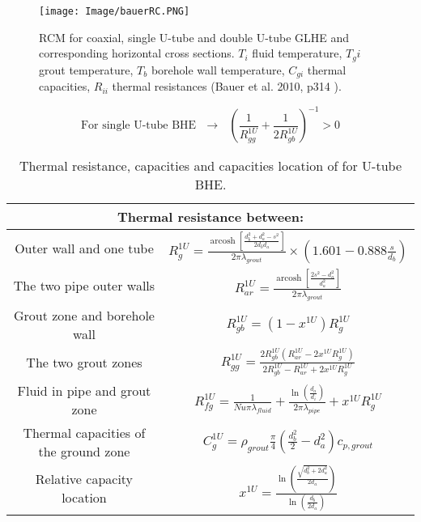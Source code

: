 \documentclass[a4paper,oneside,11pt]{report}
\begin{document}
	\begin{figure}[hbtp] 
		\centering
		\texttt{[image: Image/bauerRC.PNG]}
		\caption{RCM for coaxial, single U-tube and double U-tube GLHE and corresponding horizontal cross sections. $T_i$ fluid temperature, $T_gi$ grout temperature, $T_b$ borehole wall temperature, $C_{gi}$ thermal capacities, $R_{ii}$ thermal resistances (Bauer et al. 2010, p314 \cite{bau10}).}
		\label{fig:bf_bauerRC}
	\end{figure}

\begin{equation} \label{eq:bf_bauTest}
\text{For single U-tube BHE} \ \ \  \rightarrow \ \ \ \left( \frac{1}{R_{gg}^{1U}} + \frac{1}{2 R_{gb}^{1U}}  \right)^{-1} > 0
\end{equation}

{\setlength{\extrarowheight}{16pt}
\begin{table}
\begin{center}
\begin{tabular}{|c|c|}
\hline
\multicolumn{2}{|c|}{Thermal resistance between: } \\
\hline  \hline
Outer wall and one tube & $
R_g^{1U} =  \frac{ \operatorname{arcosh} \left[ \frac{ d_b^2 + d_a^2 - s^2}{2 d_b d_a} \right] }{ 2 \pi \lambda_{grout} } \times ( 1.601 - 0.888 \frac{s}{d_b}) 
$ \\ 
\hline 
The two pipe outer walls & $ 
R_{ar}^{1U} = \frac{ \operatorname{arcosh} \left[ \frac{ 2 s^2 - d_a^2 }{ d_a^2 } \right] }{ 2 \pi \lambda_{grout} } 
$ \\ 
\hline \hline 
Grout zone and borehole wall & $
R_{gb}^{1U} = ( 1 - x^{1U} ) R_{g}^{1U}
$ \\ 
\hline 
The two grout zones & $
R_{gg}^{1U} = \frac{ 2 R_{gb}^{1U} ( R_{ar}^{1U} - 2 x^{1U} R_{g}^{1U} ) }{ 2 R_{gb}^{1U} - R_{ar}^{1U} + 2 x^{1U} R_{g}^{1U}}
$ \\ 
\hline 
Fluid in pipe and grout zone & $
R_{fg}^{1U} = \frac{1}{Nu \pi \lambda_{fluid} } + \frac{ \ln \left( \frac{d_a}{d_i} \right) }{2 \pi \lambda_{pipe} } + x^{1U} R_g^{1U}
$ \\ 
\hline  \hline
Thermal capacities of the ground zone & $
C_g^{1U} = \rho_{grout} \frac{\pi}{4} \left( \frac{ d_b^2}{2} - d_a^2 \right) c_{p,grout}
$
\\
\hline  \hline
Relative capacity location & $
x^{1U} = \frac{ \ln\left( \frac{ \sqrt{ d_b^2 + 2 d_a^2 } }{ 2 d_a } \right) }{ \ln\left( \frac{ d_b }{ 2 d_a } \right) } 
$
\\ 
\hline 
\end{tabular} 
\end{center}
\caption{Thermal resistance, capacities and capacities location of for U-tube BHE.}
\label{tab:bf_bauRC}
\end{table}
\quad


}
\end{document}
